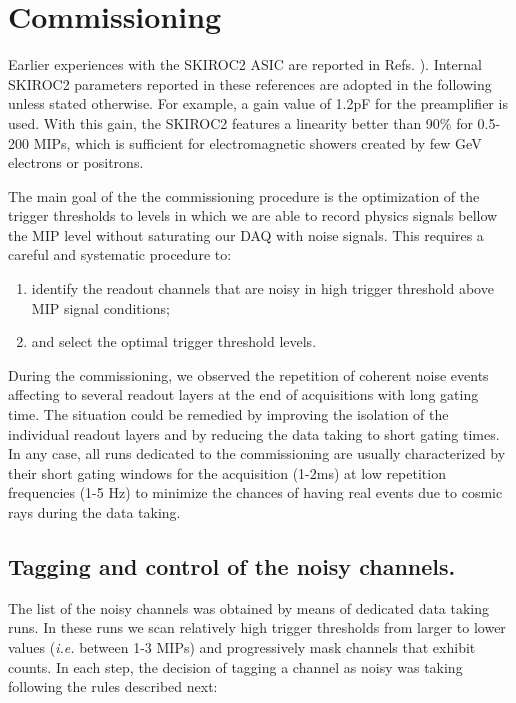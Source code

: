 \documentclass[a4paper,11pt]{article}
\begin{document}
\section{Commissioning}
\label{sec:commissioning}

Earlier experiences with the SKIROC2 ASIC are reported in
Refs. \cite{Amjad:2014tha,Suehara:2018mqk}). 
Internal SKIROC2 parameters reported in these references are adopted in the following
unless stated otherwise.
For example, a gain value of 1.2pF for the preamplifier is used. 
With this gain, the SKIROC2 features a linearity better than 90\% 
for 0.5-200 MIPs, which is sufficient for 
electromagnetic showers created by few GeV 
electrons or positrons.

The main goal of the the commissioning  procedure is 
the optimization of the trigger thresholds to levels in which we are able
to record physics signals bellow the MIP level without saturating our DAQ with
noise signals. This requires a careful and systematic procedure to:

\begin{enumerate}
  \item identify the readout channels that are noisy in high trigger threshold above MIP signal conditions;
  \item and select the optimal trigger threshold levels.
\end{enumerate}

During the commissioning, we observed the repetition of coherent noise events affecting to several
readout layers at the end of acquisitions with long gating time. The situation
could be remedied by improving the isolation of the individual readout layers and by reducing the
data taking to short gating times.
In any case, all runs dedicated to the commissioning are usually characterized by their short gating windows for the acquisition (1-2ms)
at low repetition frequencies (1-5 Hz)
to minimize the chances of having real events due to cosmic
rays during the data taking.


\subsection{Tagging and control of the noisy channels.}
\label{sec:comm_noise}

The list of the noisy channels was
obtained by means of dedicated data taking runs. In these runs
we scan relatively high trigger thresholds from larger to lower values ({\it i.e.} between 1-3 MIPs) and progressively mask channels that exhibit counts. 
In each step, the decision of tagging a channel as noisy was taking following the rules described next: 
\end{document}
